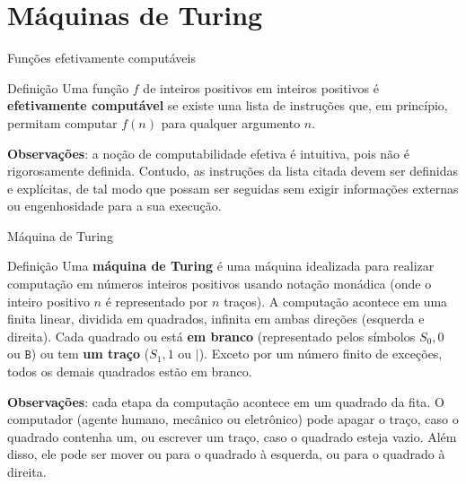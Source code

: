 \section{Máquinas de Turing}

\begin{frame}[fragile]{Funções efetivamente computáveis}

    \begin{block}{Definição}
        Uma função $f$ de inteiros positivos em inteiros positivos é \textbf{efetivamente 
        computável} se existe uma lista de instruções que, em princípio, permitam computar $f(n)$
        para qualquer argumento $n$.
    \end{block}

    \vspace{0.1in}

    \textbf{Observações}: a noção de computabilidade efetiva é intuitiva, pois não é rigorosamente
    definida. Contudo, as instruções da lista citada devem ser definidas e explícitas, de tal modo
    que possam ser seguidas sem exigir informações externas ou engenhosidade para a sua execução.
\end{frame}


\begin{frame}[fragile]{Máquina de Turing}

    \begin{block}{Definição}
        Uma \textbf{máquina de Turing} é uma máquina idealizada para realizar computação em 
        números inteiros positivos usando notação monádica (onde o inteiro positivo $n$ é 
        representado por $n$ traços). A computação acontece em uma finita linear, dividida em
        quadrados, infinita em ambas direções (esquerda e direita). Cada quadrado ou está 
        \textbf{em branco} (representado pelos símbolos $S_0, 0$ ou $\mathtt{B}$) ou tem 
        \textbf{um traço} ($S_1, 1$ ou $\mathtt{|}$).
        Exceto por um número finito de exceções, todos os demais quadrados estão em branco.
    \end{block}

    \vspace{0.1in}

    \textbf{Observações}: cada etapa da computação acontece em um quadrado da fita. O computador
    (agente humano, mecânico ou eletrônico) pode apagar o traço, caso o quadrado contenha um, ou 
    escrever um traço, caso o quadrado
    esteja vazio. Além disso, ele pode ser mover ou para o quadrado à esquerda, ou para o quadrado
    à direita.
\end{frame}

